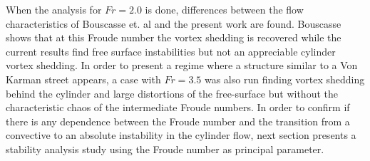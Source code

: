 When the analysis for $Fr=2.0$ is done, differences between the flow characteristics of Bouscasse et. al \cite{Bouscasse14} and the present work are found. Bouscasse shows that at this Froude number the vortex shedding is recovered while the current results find free surface instabilities but not an appreciable cylinder vortex shedding. In order to present a regime where a structure similar to a Von Karman street appears, a case with $Fr=3.5$ was also run finding vortex shedding behind the cylinder and large distortions of the free-surface but without the characteristic chaos of the intermediate Froude numbers. In order to confirm if there is any dependence between the Froude number and the transition from a convective to an absolute instability in the cylinder flow, next section presents a stability analysis study using the Froude number as principal parameter.


